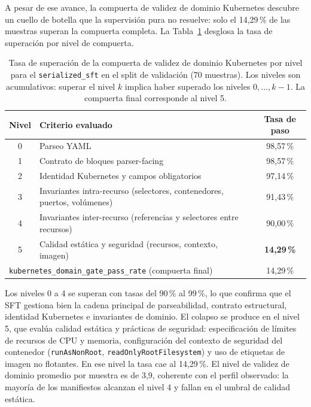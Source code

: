 A pesar de ese avance, la compuerta de validez de dominio Kubernetes descubre un cuello de
botella que la supervisión pura no resuelve: solo el 14{,}29\,\% de las muestras superan la
compuerta completa. La Tabla~\ref{tab:ch5_domain_levels} desglosa la tasa de superación por
nivel de compuerta.

\begin{table}[htbp]
\centering
\caption{Tasa de superación de la compuerta de validez de dominio Kubernetes por nivel
         para el \texttt{serialized\_sft} en el split de validación (70 muestras).
         Los niveles son acumulativos: superar el nivel $k$ implica haber superado los
         niveles $0,\ldots,k-1$. La compuerta final corresponde al nivel 5.}
\label{tab:ch5_domain_levels}
\begin{tabular}{cp{}c}
\toprule
\textbf{Nivel} & \textbf{Criterio evaluado} & \textbf{Tasa de paso} \\
\midrule
0 & Parseo YAML                                                       & 98{,}57\,\% \\
1 & Contrato de bloques parser-facing                                & 98{,}57\,\% \\
2 & Identidad Kubernetes y campos obligatorios                        & 97{,}14\,\% \\
3 & Invariantes intra-recurso (selectores, contenedores, puertos, volúmenes) & 91{,}43\,\% \\
4 & Invariantes inter-recurso (referencias y selectores entre recursos) & 90{,}00\,\% \\
5 & Calidad estática y seguridad (recursos, contexto, imagen)         & \textbf{14{,}29\,\%} \\
\midrule
\multicolumn{2}{l}{\texttt{kubernetes\_domain\_gate\_pass\_rate} (compuerta final)} & 14{,}29\,\% \\
\bottomrule
\end{tabular}
\end{table}

Los niveles 0 a 4 se superan con tasas del 90\,\% al 99\,\%, lo que confirma que el SFT
gestiona bien la cadena principal de parseabilidad, contrato estructural, identidad Kubernetes
e invariantes de dominio. El colapso se produce en el nivel 5, que evalúa calidad estática y
prácticas de seguridad: especificación de límites de
recursos de CPU y memoria, configuración del contexto de seguridad del contenedor
(\texttt{runAsNonRoot}, \texttt{readOnlyRootFilesystem}) y uso de etiquetas de imagen no
flotantes. En ese nivel la tasa cae al 14{,}29\,\%. El nivel de validez de dominio promedio
por muestra es de 3{,}9, coherente con el perfil observado: la mayoría de los manifiestos
alcanzan el nivel 4 y fallan en el umbral de calidad estática.

